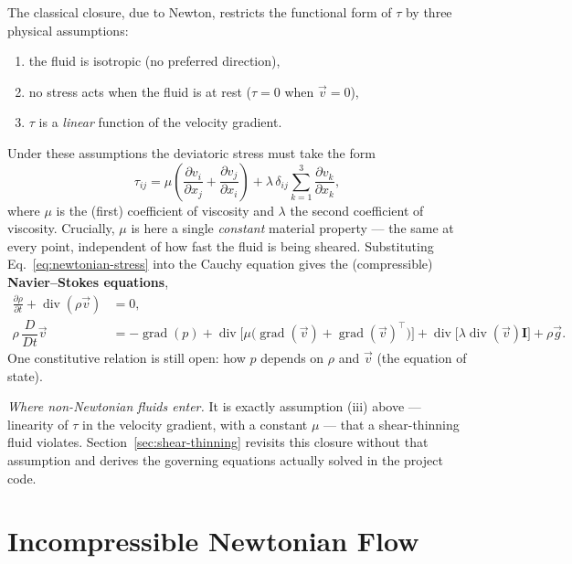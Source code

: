 \documentclass[11pt]{article}
\newcommand{\vv}{\vec{v}}
\newcommand{\vg}{\vec{g}}
\newcommand{\DDt}{\dfrac{D}{Dt}}
\begin{document}
The classical closure, due to Newton, restricts the functional form of $\tau$ by three physical assumptions:
\begin{enumerate}[label=(\roman*)]
  \item the fluid is isotropic (no preferred direction),
  \item no stress acts when the fluid is at rest ($\tau = 0$ when $\vv = 0$),
  \item $\tau$ is a \emph{linear} function of the velocity gradient.
\end{enumerate}
Under these assumptions the deviatoric stress must take the form
\begin{equation}
  \tau_{ij} = \mu\left(\frac{\partial v_i}{\partial x_j} + \frac{\partial v_j}{\partial x_i}\right) + \lambda\,\delta_{ij}\sum_{k=1}^{3}\frac{\partial v_k}{\partial x_k},
  \label{eq:newtonian-stress}
\end{equation}
where $\mu$ is the (first) coefficient of viscosity and $\lambda$ the second coefficient of viscosity. Crucially, $\mu$ is here a single \emph{constant} material property — the same at every point, independent of how fast the fluid is being sheared. Substituting Eq.~\eqref{eq:newtonian-stress} into the Cauchy equation gives the (compressible) \textbf{Navier--Stokes equations},
\begin{align}
  \frac{\partial \rho}{\partial t} + \operatorname{div}(\rho\vv) &= 0,\\
  \rho\,\DDt\vv &= -\operatorname{grad}(p) + \operatorname{div}\!\big[\mu\big(\operatorname{grad}(\vv)+\operatorname{grad}(\vv)^\top\big)\big] + \operatorname{div}\big[\lambda\operatorname{div}(\vv)\mathbf{I}\big] + \rho\vg.
\end{align}
One constitutive relation is still open: how $p$ depends on $\rho$ and $\vv$ (the equation of state).

\medskip
\noindent\textit{Where non-Newtonian fluids enter.} It is exactly assumption (iii) above — linearity of $\tau$ in the velocity gradient, with a constant $\mu$ — that a shear-thinning fluid violates. Section~\ref{sec:shear-thinning} revisits this closure without that assumption and derives the governing equations actually solved in the project code.

\section{Incompressible Newtonian Flow}
\end{document}
